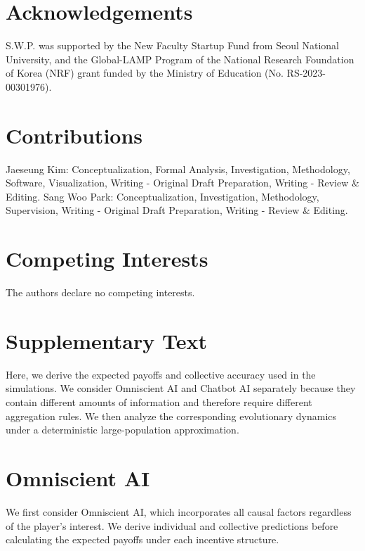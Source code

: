 \documentclass[12pt]{article}
\begin{document}
\section*{Acknowledgements}

S.W.P. was supported by the New Faculty Startup Fund from Seoul National University,
and the Global-LAMP Program of the National Research Foundation of Korea (NRF) grant funded by the Ministry of Education (No. RS-2023-00301976).

\section*{Contributions}

Jaeseung Kim: Conceptualization, Formal Analysis, Investigation, Methodology, Software, Visualization, Writing - Original Draft Preparation, Writing - Review \& Editing.
Sang Woo Park: Conceptualization, Investigation, Methodology, Supervision, Writing - Original Draft Preparation, Writing - Review \& Editing.

\section*{Competing Interests}

The authors declare no competing interests.

\pagebreak

\setcounter{figure}{0}
\setcounter{equation}{0}
\setcounter{section}{0}
\renewcommand{\thefigure}{S\arabic{figure}}
\renewcommand{\theequation}{S\arabic{equation}}
\renewcommand{\thetable}{S\arabic{table}}
\renewcommand{\thesection}{S\arabic{section}}

\section*{Supplementary Text}

Here, we derive the expected payoffs and collective accuracy used in the simulations.
We consider Omniscient AI and Chatbot AI separately because they contain different amounts of information and therefore require different aggregation rules.
We then analyze the corresponding evolutionary dynamics under a deterministic large-population approximation.

\section{Omniscient AI}

We first consider Omniscient AI, which incorporates all causal factors regardless of the player's interest. 
We derive individual and collective predictions before calculating the expected payoffs under each incentive structure.
\end{document}
